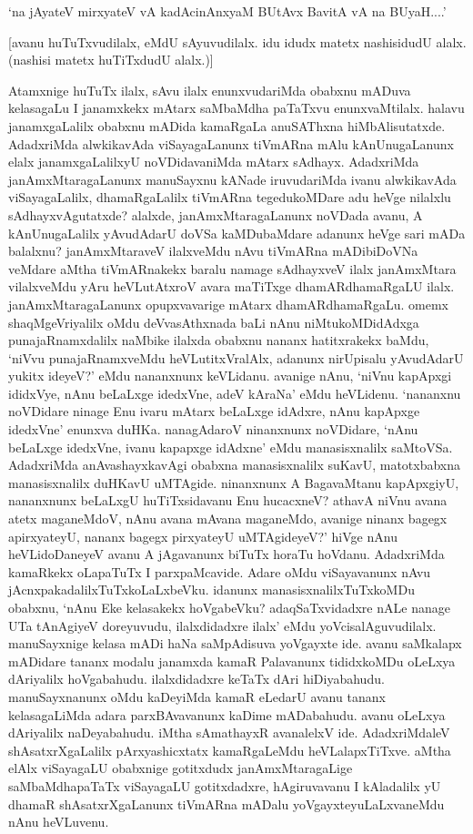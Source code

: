 \begin{shloka}
`na jAyateV mirxyateV vA kadAcinAnx\s yaM BUtAvx BavitA vA na BUyaH....' 
\end{shloka}

[avanu huTuTxvudilalx, eMdU sAyuvudilalx. idu idudx matetx nashisidudU alalx. (nashisi matetx huTiTxdudU alalx.)]

Atamxnige huTuTx ilalx, sAvu ilalx enunxvudariMda obabxnu mADuva kelasagaLu I janamxkekx mAtarx saMbaMdha paTaTxvu enunxvaMtilalx. halavu janamxgaLalilx obabxnu mADida kamaRgaLa anuSAThxna hiMbAlisutatxde. AdadxriMda alwkikavAda viSayagaLanunx tiVmARna mAlu kAnUnugaLanunx elalx janamxgaLalilxyU noVDidavaniMda mAtarx sAdhayx. AdadxriMda janAmxMtaragaLanunx manuSayxnu kANade iruvudariMda ivanu alwkikavAda viSayagaLalilx, dhamaRgaLalilx tiVmARna tegedukoMDare adu heVge nilalxlu sAdhayxvAgutatxde? alalxde, janAmxMtaragaLanunx noVDada avanu, A kAnUnugaLalilx yAvudAdarU doVSa kaMDubaMdare adanunx heVge sari mADa balalxnu? janAmxMtaraveV ilalxveMdu nAvu tiVmARna mADibiDoVNa veMdare aMtha tiVmARnakekx baralu namage sAdhayxveV ilalx janAmxMtara vilalxveMdu yAru heVLutAtxroV avara maTiTxge dhamARdhamaRgaLU ilalx. janAmxMtaragaLanunx opupxvavarige mAtarx dhamARdhamaRgaLu. omemx shaqMgeVriyalilx oMdu deVvasAthxnada baLi nAnu niMtukoMDidAdxga punajaRnamxdalilx naMbike ilalxda obabxnu nananx hatitxrakekx baMdu, `niVvu punajaRnamxveMdu heVLutitxVralAlx, adanunx nirUpisalu yAvudAdarU yukitx ideyeV?' eMdu nananxnunx keVLidanu. avanige nAnu, `niVnu kapApxgi ididxVye, nAnu beLaLxge idedxVne, adeV kAraNa' eMdu heVLidenu. `nananxnu noVDidare ninage Enu ivaru mAtarx beLaLxge idAdxre, nAnu kapApxge idedxVne' enunxva duHKa. nanagAdaroV ninanxnunx noVDidare, `nAnu beLaLxge idedxVne, ivanu kapapxge idAdxne' eMdu manasisxnalilx saMtoVSa. AdadxriMda anAvashayxkavAgi obabxna manasisxnalilx suKavU, matotxbabxna manasisxnalilx duHKavU uMTAgide. ninanxnunx A BagavaMtanu kapApxgiyU, nananxnunx beLaLxgU huTiTxsidavanu Enu hucacxneV? athavA niVnu avana atetx maganeMdoV, nAnu avana mAvana maganeMdo, avanige ninanx bagegx apirxyateyU, nananx bagegx pirxyateyU uMTAgideyeV?' hiVge nAnu heVLidoDaneyeV avanu A jAgavanunx biTuTx horaTu hoVdanu. AdadxriMda kamaRkekx oLapaTuTx I parxpaMcavide. Adare oMdu viSayavanunx nAvu jAcnxpakadalilxTuTxkoLaLxbeVku. idanunx manasisxnalilxTuTxkoMDu obabxnu, `nAnu Eke kelasakekx hoVgabeVku? adaqSaTxvidadxre nALe nanage UTa tAnAgiyeV doreyuvudu, ilalxdidadxre ilalx' eMdu yoVcisalAguvudilalx. manuSayxnige kelasa mADi haNa saMpAdisuva yoVgayxte ide. avanu saMkalapx mADidare tananx modalu janamxda kamaR Palavanunx tididxkoMDu oLeLxya dAriyalilx hoVgabahudu. ilalxdidadxre keTaTx dAri hiDiyabahudu. manuSayxnanunx oMdu kaDeyiMda kamaR eLedarU avanu tananx kelasagaLiMda adara parxBAvavanunx kaDime mADabahudu. avanu oLeLxya dAriyalilx naDeyabahudu. iMtha sAmathayxR avanalelxV ide. AdadxriMdaleV shAsatxrXgaLalilx pArxyashicxtatx kamaRgaLeMdu heVLalapxTiTxve. aMtha elAlx viSayagaLU obabxnige gotitxdudx janAmxMtaragaLige saMbaMdhapaTaTx viSayagaLU gotitxdadxre, hAgiruvavanu I kAladalilx yU dhamaR shAsatxrXgaLanunx tiVmARna mADalu yoVgayxteyuLaLxvaneMdu nAnu heVLuvenu.

